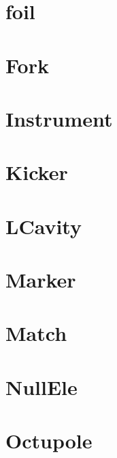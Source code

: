 \section{foil}
\label{s:foil}


\section{Fork}
\label{s:fork}


\section{Instrument}
\label{s:instrument}


\section{Kicker}
\label{s:kicker}


\section{LCavity}
\label{s:lcav}


\section{Marker}
\label{s:marker}


\section{Match}
\label{s:match}


\section{NullEle}
\label{s:nullele}


\section{Octupole}
\label{s:oct}


